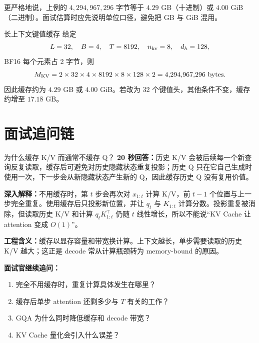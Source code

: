 更严格地说，上例的 $4{,}294{,}967{,}296$ 字节等于 $4.29$ GB（十进制）或 $4.00$ GiB（二进制）。面试估算时应先说明单位口径，避免把 GB 与 GiB 混用。

\begin{exercisebox}{长上下文键值缓存}
给定
\[
L=32,\quad B=4,\quad T=8192,\quad
n_{\rm kv}=8,\quad d_h=128,
\]
BF16 每个元素占 2 字节，则
\[
M_{\rm KV}=2\times32\times4\times8192\times8\times128\times2
=4{,}294{,}967{,}296\text{ bytes}.
\]
因此缓存约为 $4.29$ GB 或 $4.00$ GiB。若改为 32 个键值头，其他条件不变，缓存约增至 $17.18$ GB。
\end{exercisebox}

\section{面试追问链}

\begin{interviewbox}{为什么缓存 K/V 而通常不缓存 Q？}
\textbf{20 秒回答：}历史 K/V 会被后续每一个新查询反复读取，缓存后可避免对历史隐藏状态重复投影；历史 Q 只在它自己生成时使用一次，下一步会从新隐藏状态产生新的 Q，因此缓存历史 Q 没有复用价值。

\textbf{深入解释：}不用缓存时，第 $t$ 步会再次对 $x_{1:t}$ 计算 K/V，前 $t-1$ 个位置与上一步完全重复。使用缓存后只投影新位置，并让 $q_t$ 与 $K_{1:t}$ 计算分数。投影重复被消除，但读取历史 K/V 和计算 $q_tK_{1:t}^\top$ 仍随 $t$ 线性增长，所以不能说“KV Cache 让 attention 变成 $O(1)$”。

\textbf{工程含义：}缓存以显存容量和带宽换计算。上下文越长，单步需要读取的历史 K/V 越大；这正是 decode 常从计算瓶颈转为 memory-bound 的原因。

\textbf{面试官继续追问：}
\begin{enumerate}
  \item 完全不用缓存时，重复计算具体发生在哪里？
  \item 缓存后单步 attention 还剩多少与 $T$ 有关的工作？
  \item GQA 为什么同时降低缓存和 decode 带宽？
  \item KV Cache 量化会引入什么误差？
\end{enumerate}
\end{interviewbox}

